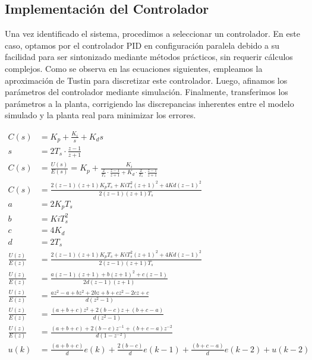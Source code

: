 \documentclass[conference,onecolumn]{IEEEtran}
\begin{document}
\subsection{Implementación del Controlador}

Una vez identificado el sistema, procedimos a seleccionar un controlador. En este caso, optamos por el controlador PID en configuración paralela debido a su facilidad para ser sintonizado mediante métodos prácticos, sin requerir cálculos complejos. Como se observa en las ecuaciones siguientes, empleamos la aproximación de Tustin para discretizar este controlador. Luego, afinamos los parámetros del controlador mediante simulación. Finalmente, transferimos los parámetros a la planta, corrigiendo las discrepancias inherentes entre el modelo simulado y la planta real para minimizar los errores.

\begin{align}
C(s) &= K_p + \frac{K_i}{s} + K_d s \label{eq:1} \\
s &= 2T_s \cdot \frac{z - 1}{z + 1} \label{eq:2} \\
C(s) &= \frac{U(s)}{E(s)} = K_p + \frac{K_i}{\frac{2}{T_s} \cdot \frac{z - 1}{z + 1} + K_d \cdot \frac{2}{T_s} \cdot \frac{z - 1}{z + 1}} \label{eq:3} \\
C(s) &= \frac{2(z - 1)(z + 1)K_pT_s + KiT_s^2(z + 1)^2 + 4Kd(z - 1)^2}{2(z - 1)(z + 1)T_s} \label{eq:4} \\
a &= 2K_pT_s \label{eq:5} \\
b &= KiT_s^2 \label{eq:6} \\
c &= 4K_d \label{eq:7} \\
d &= 2T_s \label{eq:8} \\
\frac{U(z)}{E(z)} &= \frac{2(z - 1)(z + 1)K_pT_s + KiT_s^2(z + 1)^2 + 4Kd(z - 1)^2}{2(z - 1)(z + 1)T_s} \label{eq:9} \\
\frac{U(z)}{E(z)} &= \frac{a(z - 1)(z + 1) + b(z + 1)^2 + c(z - 1)}{2d(z - 1)(z + 1)} \label{eq:10} \\
\frac{U(z)}{E(z)} &= \frac{az^2 - a + bz^2 + 2bz + b + cz^2 - 2cz + c}{d(z^2 - 1)} \label{eq:11} \\
\frac{U(z)}{E(z)} &= \frac{(a + b + c)z^2 + 2(b - c)z + (b + c - a)}{d(z^2 - 1)} \label{eq:12} \\
\frac{U(z)}{E(z)} &= \frac{(a + b + c) + 2(b - c)z^{-1} + (b + c - a)z^{-2}}{d(1 - z^{-2})} \label{eq:13} \\
u(k) &= \frac{(a + b + c)}{d}e(k) + \frac{2(b - c)}{d}e(k - 1) + \frac{(b + c - a)}{d}e(k - 2) + u(k - 2) \label{eq:14}
\end{align}
\end{document}
